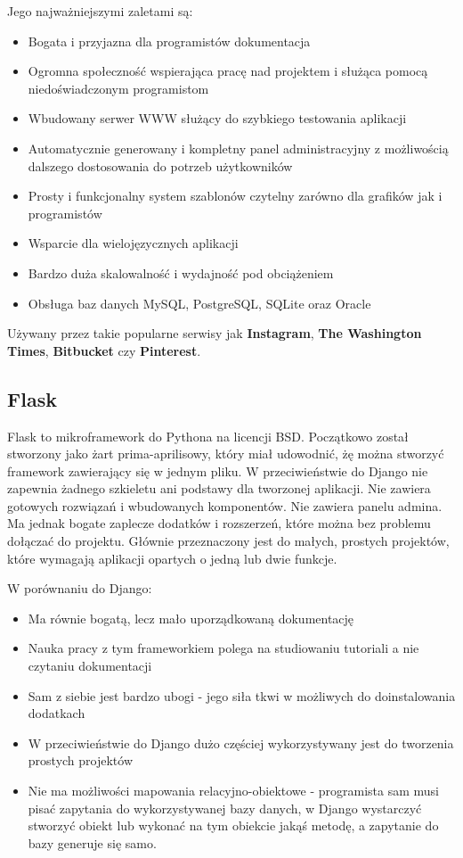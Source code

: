 \documentclass[]{mgr}
\begin{document}
            Jego najważniejszymi zaletami są:
            \begin{itemize}
                \item Bogata i przyjazna dla programistów dokumentacja
                \item Ogromna społeczność wspierająca pracę nad projektem i służąca pomocą niedoświadczonym programistom
                \item Wbudowany serwer WWW służący do szybkiego testowania aplikacji
                \item Automatycznie generowany i kompletny panel administracyjny z możliwością dalszego dostosowania do potrzeb użytkowników
                \item Prosty i funkcjonalny system szablonów czytelny zarówno dla grafików jak i programistów
                \item Wsparcie dla wielojęzycznych aplikacji
                \item Bardzo duża skalowalność i wydajność pod obciążeniem
                \item Obsługa baz danych MySQL, PostgreSQL, SQLite oraz Oracle
            \end{itemize}

            Używany przez takie popularne serwisy jak \textbf{Instagram}, \textbf{The Washington Times}, \textbf{Bitbucket} czy \textbf{Pinterest}.

            \subsection{Flask}
            Flask to mikroframework do Pythona na licencji BSD. Początkowo został stworzony jako żart prima-aprilisowy, który miał udowodnić, żę można stworzyć framework zawierający się w jednym pliku. W przeciwieństwie do Django nie zapewnia żadnego szkieletu ani podstawy dla tworzonej aplikacji. Nie zawiera gotowych rozwiązań i wbudowanych komponentów. Nie zawiera panelu admina. Ma jednak bogate zaplecze dodatków i rozszerzeń, które można bez problemu dołączać do projektu. Głównie przeznaczony jest do małych, prostych projektów, które wymagają aplikacji opartych o jedną lub dwie funkcje.

            W porównaniu do Django:
            \begin{itemize}
                \item Ma równie bogatą, lecz mało uporządkowaną dokumentację
                \item Nauka pracy z tym frameworkiem polega na studiowaniu tutoriali a nie czytaniu dokumentacji
                \item Sam z siebie jest bardzo ubogi - jego siła tkwi w możliwych do doinstalowania dodatkach
                \item W przeciwieństwie do Django dużo częściej wykorzystywany jest do tworzenia prostych projektów
                \item Nie ma możliwości mapowania relacyjno-obiektowe - programista sam musi pisać zapytania do wykorzystywanej bazy danych, w Django wystarczyć stworzyć obiekt lub wykonać na tym obiekcie jakąś metodę, a zapytanie do bazy generuje się samo.
            \end{itemize}
\end{document}
